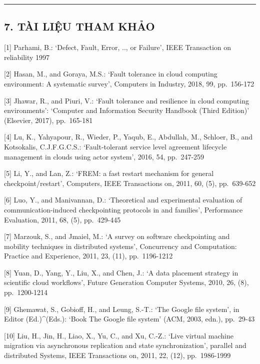 \documentclass[
  vietnamese,
]{article}
\begin{document}
\begin{center}\rule{0.5\linewidth}{0.5pt}\end{center}

\subsection{7. TÀI LIỆU THAM
KHẢO}\label{tuxe0i-liux1ec7u-tham-khux1ea3o}

{[}1{]} Parhami, B.: `Defect, Fault, Error, .., or Failure', IEEE
Transaction on reliability 1997

{[}2{]} Hasan, M., and Goraya, M.S.: `Fault tolerance in cloud computing
environment: A systematic survey', Computers in Industry, 2018, 99,
pp.~156-172

{[}3{]} Jhawar, R., and Piuri, V.: `Fault tolerance and resilience in
cloud computing environments': `Computer and Information Security
Handbook (Third Edition)' (Elsevier, 2017), pp.~165-181

{[}4{]} Lu, K., Yahyapour, R., Wieder, P., Yaqub, E., Abdullah, M.,
Schloer, B., and Kotsokalis, C.J.F.G.C.S.: `Fault-tolerant service level
agreement lifecycle management in clouds using actor system', 2016, 54,
pp.~247-259

{[}5{]} Li, Y., and Lan, Z.: `FREM: a fast restart mechanism for general
checkpoint/restart', Computers, IEEE Transactions on, 2011, 60, (5),
pp.~639-652

{[}6{]} Luo, Y., and Manivannan, D.: `Theoretical and experimental
evaluation of communication-induced checkpointing protocols in and
families', Performance Evaluation, 2011, 68, (5), pp.~429-445

{[}7{]} Marzouk, S., and Jmaiel, M.: `A survey on software checkpointing
and mobility techniques in distributed systems', Concurrency and
Computation: Practice and Experience, 2011, 23, (11), pp.~1196-1212

{[}8{]} Yuan, D., Yang, Y., Liu, X., and Chen, J.: `A data placement
strategy in scientific cloud workflows', Future Generation Computer
Systems, 2010, 26, (8), pp.~1200-1214

{[}9{]} Ghemawat, S., Gobioff, H., and Leung, S.-T.: `The Google file
system', in Editor (Ed.)\^{}(Eds.): `Book The Google file system' (ACM,
2003, edn.), pp.~29-43

{[}10{]} Liu, H., Jin, H., Liao, X., Yu, C., and Xu, C.-Z.: `Live
virtual machine migration via asynchronous replication and state
synchronization', parallel and distributed Systems, IEEE Transactions
on, 2011, 22, (12), pp.~1986-1999
\end{document}
